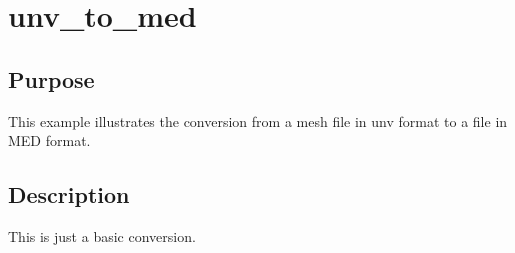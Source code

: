 \chapter{unv\_to\_med}
%
%
\section{Purpose}
This example illustrates the conversion from a mesh file in unv format to a
file in MED format.
%
\section{Description}
This is just a basic conversion.
%
%
%
%
%
%
%
%

%
